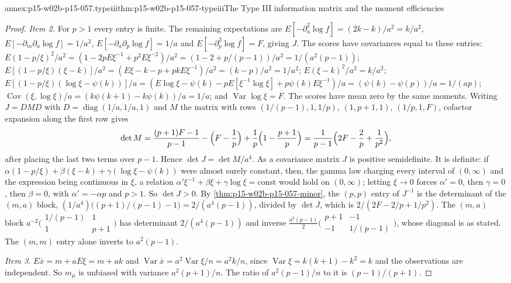 \begin{annexitem}{annex:p15-w02b-p15-057.typeiii}{thm:p15-w02b-p15-057-typeiii}{The Type III information matrix and the moment efficiencies}
\begin{proof}
\emph{Item 2.} For \(p>1\) every entry is finite. The remaining expectations
are \(E[-\partial_a^2\log f]=(2k-k)/a^2=k/a^2\),
\(E[-\partial_m\partial_a\log f]=1/a^2\),
\(E[-\partial_a\partial_p\log f]=1/a\) and \(E[-\partial_p^2\log f]=F\),
giving \(J\). The scores have covariances equal to these entries:
\(E(1-p/\xi)^2/a^2=(1-2pE\xi^{-1}+p^2E\xi^{-2})/a^2
=(1-2+p/(p-1))/a^2=1/(a^2(p-1))\);
\(E[(1-p/\xi)(\xi-k)]/a^2=(E\xi-k-p+pkE\xi^{-1})/a^2=(k-p)/a^2=1/a^2\);
\(E(\xi-k)^2/a^2=k/a^2\);
\(E[(1-p/\xi)(\log\xi-\psi(k))]/a
=(E\log\xi-\psi(k)-pE[\xi^{-1}\log\xi]+p\psi(k)E\xi^{-1})/a
=(\psi(k)-\psi(p))/a=1/(ap)\);
\(\operatorname{Cov}(\xi,\log\xi)/a=(k\psi(k+1)-k\psi(k))/a=1/a\); and
\(\operatorname{Var}\log\xi=F\). The scores have mean zero by the same
moments. Writing \(J=DMD\) with \(D=\operatorname{diag}(1/a,1/a,1)\) and
\(M\) the matrix with rows \((1/(p-1),1,1/p)\), \((1,p+1,1)\),
\((1/p,1,F)\), cofactor expansion along the first row gives
\[
 \det M=\frac{(p+1)F-1}{p-1}-\Bigl(F-\frac1p\Bigr)
 +\frac1p\Bigl(1-\frac{p+1}{p}\Bigr)
 =\frac{1}{p-1}\Bigl(2F-\frac2p+\frac1{p^2}\Bigr),
\]
after placing the last two terms over \(p-1\). Hence
\(\det J=\det M/a^4\). As a covariance matrix \(J\) is positive
semidefinite. It is definite: if
\(\alpha(1-p/\xi)+\beta(\xi-k)+\gamma(\log\xi-\psi(k))\) were almost surely
constant, then, the gamma law charging every interval of \((0,\infty)\)
and the expression being continuous in \(\xi\), a relation
\(\alpha'\xi^{-1}+\beta\xi+\gamma\log\xi=\text{const}\) would hold on
\((0,\infty)\); letting \(\xi\to0\) forces \(\alpha'=0\), then
\(\gamma=0\), then \(\beta=0\), with \(\alpha'=-\alpha p\) and \(p>1\).
So \(\det J>0\). By \cref{thm:p15-w02b-p15-057-minor}, the \((p,p)\) entry
of \(J^{-1}\) is the determinant of the \((m,a)\) block,
\((1/a^4)\bigl((p+1)/(p-1)-1\bigr)=2/(a^4(p-1))\), divided by \(\det J\),
which is \(2/(2F-2/p+1/p^2)\). The \((m,a)\) block
\(a^{-2}\bigl(\begin{smallmatrix}1/(p-1)&1\\1&p+1\end{smallmatrix}\bigr)\)
has determinant \(2/(a^4(p-1))\) and inverse
\(\frac{a^2(p-1)}2\bigl(\begin{smallmatrix}p+1&-1\\-1&1/(p-1)
\end{smallmatrix}\bigr)\), whose diagonal is as stated. The
\((m,m)\) entry alone inverts to \(a^2(p-1)\).

\emph{Item 3.} \(E\overline x=m+aE\xi=m+ak\) and
\(\operatorname{Var}\overline x=a^2\operatorname{Var}\xi/n=a^2k/n\), since
\(\operatorname{Var}\xi=k(k+1)-k^2=k\) and the observations are independent.
So \(m_\mu\) is unbiased with variance \(a^2(p+1)/n\). The ratio of
\(a^2(p-1)/n\) to it is \((p-1)/(p+1)\).


\end{proof}
\end{annexitem}
